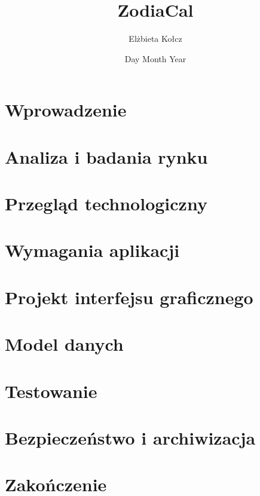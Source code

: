 \documentclass[12pt]{report}
\title{ZodiaCal}
\author{Elżbieta Kołcz}
\date{Day Month Year}
\begin{document}

\tableofcontents

\listoffigures

\chapter{Wprowadzenie}


\chapter{Analiza i badania rynku}


\chapter{Przegląd technologiczny}


\chapter{Wymagania aplikacji}


\chapter{Projekt interfejsu graficznego}


\chapter{Model danych}


\chapter{Testowanie}


\chapter{Bezpieczeństwo i archiwizacja}


\chapter{Zakończenie}


\printbibliography[heading=bibintoc, title={Bibliografia}]
\end{document}
